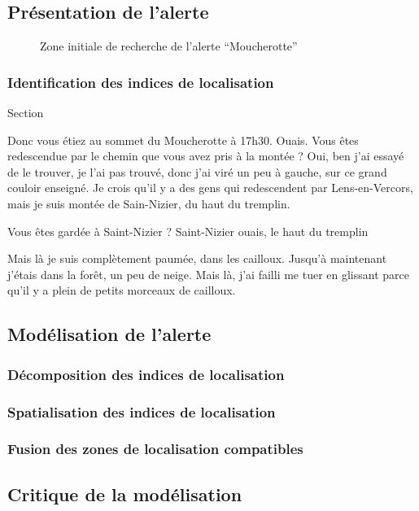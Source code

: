 
\subsection{Présentation de l'alerte}
\label{subsec:9-3-1}


\begin{figure}
  \centering
  
  \caption{Zone initiale de recherche de l'alerte
    \enquote{Moucherotte}}
  \label{fig:zir_moucherotte}
\end{figure}

\subsubsection{Identification des indices de localisation}
\label{subsec:9-3-1-1}

Section

\begin{dialogue}
  \Sec {} Donc vous étiez au sommet du Moucherotte à 17h30.
  \Req Ouais.
  \Sec {} Vous êtes redescendue par le chemin que
  vous avez pris à la montée ?
  \Req {} Oui, ben j’ai essayé de le trouver, je l’ai pas
  trouvé,  donc j’ai viré un peu à gauche,  sur ce
  grand couloir enseigné.  Je crois qu’il y a des gens
  qui redescendent par Lens-en-Vercors,  mais je suis
  montée de Sain-Nizier, du haut du tremplin.
\end{dialogue}
% 


\begin{dialogue}
  \Sec {} Vous êtes gardée à Saint-Nizier ?
  \Req {} Saint-Nizier ouais, le haut du tremplin
\end{dialogue}


\begin{dialogue}
  \Req {} Mais là je suis complètement paumée,  dans
  les cailloux.  Jusqu’à maintenant j’étais dans la forêt,
   un peu de neige.  Mais là, j’ai failli me tuer
  en glissant  parce qu’il y a plein de petits morceaux de
  cailloux.
\end{dialogue}


\subsection{Modélisation de l'alerte}
\label{subsec:9-3-2}

\subsubsection{Décomposition des indices de localisation}
\label{subsec:9-3-2-2}

\subsubsection{Spatialisation des indices de localisation}
\label{subsec:9-3-2-3}

\subsubsection{Fusion des zones de localisation compatibles}
\label{subsec:9-3-2-4}

\subsection{Critique de la modélisation}
\label{subsec:9-3-3}


